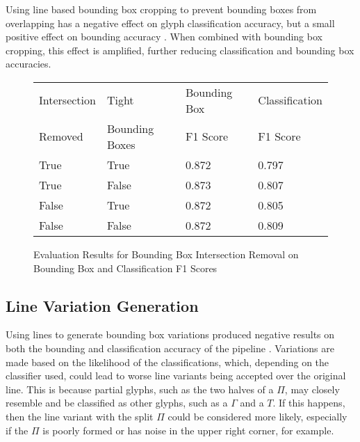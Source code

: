 Using line based bounding box cropping to prevent bounding boxes from overlapping has a negative effect on glyph classification accuracy, but a small positive effect on bounding accuracy . When combined with bounding box cropping, this effect is amplified, further reducing classification and bounding box accuracies.

\begin{figure}[H]
    \caption{Evaluation Results for Bounding Box Intersection Removal on Bounding Box and Classification F1 Scores}
    \label{fig:lineIntersect}
    \begin{center}
      \begin{tabular}{ | l | l | l | l | }
          \hline
          Intersection & Tight & Bounding Box & Classification \\
          Removed & Bounding Boxes & F1 Score & F1 Score \\
          \hline
          True & True & 0.872	& 0.797 \\
          True & False & 0.873 & 0.807 \\
          False & True & 0.872 & 0.805 \\
          False & False & 0.872	& 0.809 \\
          \hline
      \end{tabular}
    \end{center}
\end{figure}

\subsection{Line Variation Generation}

Using lines to generate bounding box variations produced negative results on both the bounding and classification accuracy of the pipeline . Variations are made based on the likelihood of the classifications, which, depending on the classifier used, could lead to worse line variants being accepted over the original line. This is because partial glyphs, such as the two halves of a $\Pi$, may closely resemble and be classified as other glyphs, such as a $\Gamma$ and a $T$. If this happens, then the line variant with the split $\Pi$ could be considered more likely, especially if the $\Pi$ is poorly formed or has noise in the upper right corner, for example.

